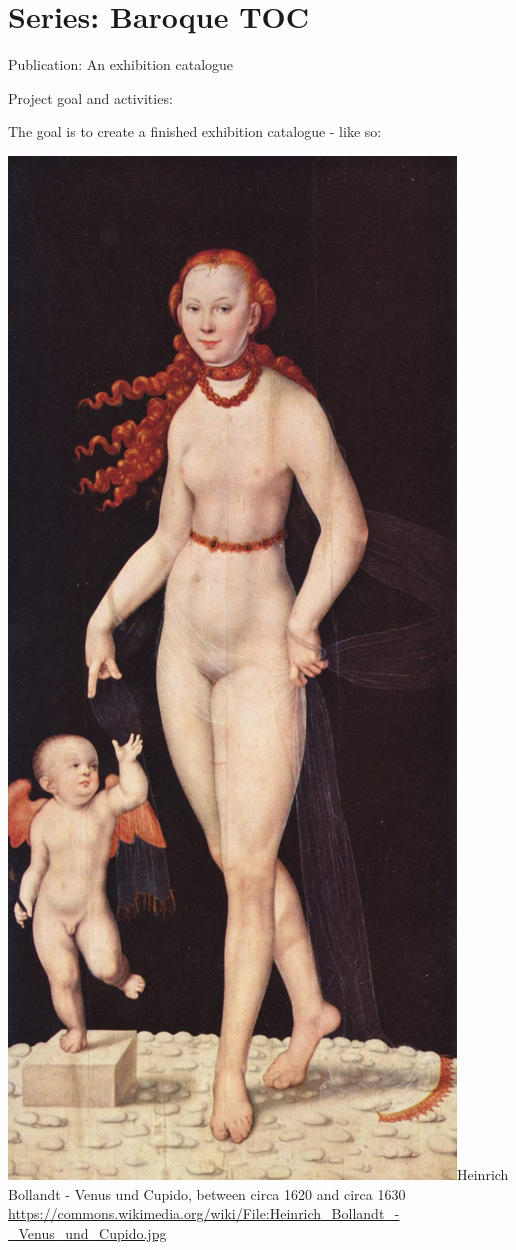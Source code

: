 \documentclass[
  letterpaper,
]{book}
\begin{document}
\hypertarget{series-baroque-toc}{%
\section{Series: Baroque TOC}\label{series-baroque-toc}}

Publication: An exhibition catalogue

Project goal and activities:

The goal is to create a finished exhibition catalogue - like so:

\includegraphics{./6780765/Cupido.jpg}Heinrich Bollandt - Venus und
Cupido, between circa 1620 and circa 1630
\url{https://commons.wikimedia.org/wiki/File:Heinrich_Bollandt_-_Venus_und_Cupido.jpg}
\end{document}
